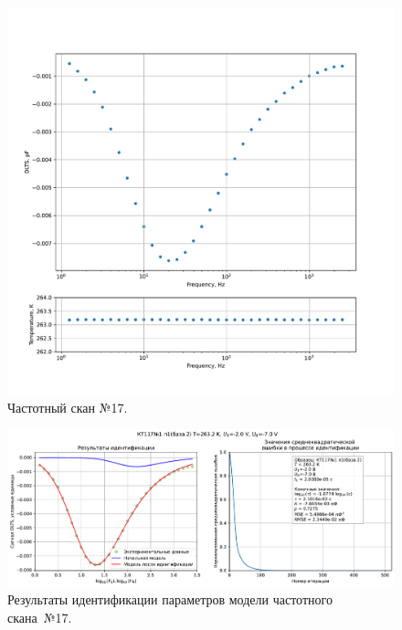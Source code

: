 \begin{figure}[!ht]
    \centering
    \includegraphics[width=1\textwidth]{../plots/КТ117№1_п1(база 2)_2500Гц-1Гц_1пФ_-10С_-2В-7В_100мВ_20мкс_шаг_0,1.pdf}
    \caption{Частотный скан №17.}
    \label{pic:frequency_scan_17}
\end{figure}

\begin{figure}[!ht]
    \centering
    \includegraphics[width=1\textwidth]{../plots/КТ117№1_п1(база 2)_2500Гц-1Гц_1пФ_-10С_-2В-7В_100мВ_20мкс_шаг_0,1_model.pdf}
    \caption{Результаты идентификации параметров модели частотного скана~№17.}
    \label{pic:frequency_scan_model17}
\end{figure}

\pagebreak



